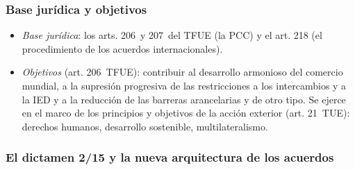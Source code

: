 \documentclass[11pt]{article}
\begin{document}
\subsubsection{Base jurídica y objetivos}\label{sec:base-juridica}

\begin{itemize}
\item \emph{Base jurídica}: los arts. 206~y 207~del TFUE (la PCC) y el art. 218 (el procedimiento de los acuerdos internacionales).
\item \emph{Objetivos} (art. 206~TFUE): contribuir al desarrollo armonioso del comercio mundial, a la supresión progresiva de las restricciones a los intercambios y a la IED y a la reducción de las barreras arancelarias y de otro tipo. Se ejerce en el marco de los principios y objetivos de la acción exterior (art. 21~TUE): derechos humanos, desarrollo sostenible, multilateralismo.
\end{itemize}

\subsubsection{El dictamen 2/15 y la nueva arquitectura de los acuerdos}\label{sec:dictamen}
\end{document}
